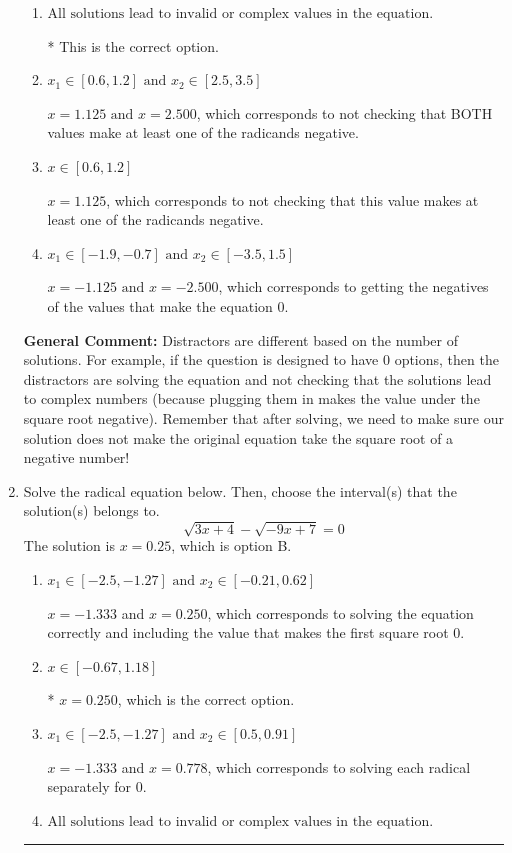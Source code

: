 \documentclass{extbook}[14pt]
\newcommand{\litem}[1]{\item #1

\rule{\textwidth}{0.4pt}}
\begin{document}
\begin{enumerate}
{\begin{enumerate}[label=\Alph*.]
$x = 2.500$, which corresponds to not checking that this value makes at least one of the radicands negative.
\item \( \text{All solutions lead to invalid or complex values in the equation.} \)

* This is the correct option.
\item \( x_1 \in [0.6, 1.2] \text{ and } x_2 \in [2.5,3.5] \)

$x = 1.125 \text{ and } x = 2.500$, which corresponds to not checking that BOTH values make at least one of the radicands negative.
\item \( x \in [0.6,1.2] \)

$x = 1.125$, which corresponds to not checking that this value makes at least one of the radicands negative.
\item \( x_1 \in [-1.9, -0.7] \text{ and } x_2 \in [-3.5,1.5] \)

$x = -1.125 \text{ and } x = -2.500$, which corresponds to getting the negatives of the values that make the equation 0.
\end{enumerate}

\textbf{General Comment:} Distractors are different based on the number of solutions. For example, if the question is designed to have 0 options, then the distractors are solving the equation and not checking that the solutions lead to complex numbers (because plugging them in makes the value under the square root negative). Remember that after solving, we need to make sure our solution does not make the original equation take the square root of a negative number!
}
\litem{
Solve the radical equation below. Then, choose the interval(s) that the solution(s) belongs to.
\[ \sqrt{3 x + 4} - \sqrt{-9 x + 7} = 0 \]The solution is \( x = 0.25 \), which is option B.\begin{enumerate}[label=\Alph*.]
\item \( x_1 \in [-2.5, -1.27] \text{ and } x_2 \in [-0.21,0.62] \)

$x = -1.333$ and $x = 0.250$, which corresponds to solving the equation correctly and including the value that makes the first square root 0.
\item \( x \in [-0.67,1.18] \)

* $x = 0.250$, which is the correct option.
\item \( x_1 \in [-2.5, -1.27] \text{ and } x_2 \in [0.5,0.91] \)

$x = -1.333$ and $x = 0.778$, which corresponds to solving each radical separately for 0.
\item \( \text{All solutions lead to invalid or complex values in the equation.} \)


\end{enumerate}}
\end{enumerate}
\end{document}
